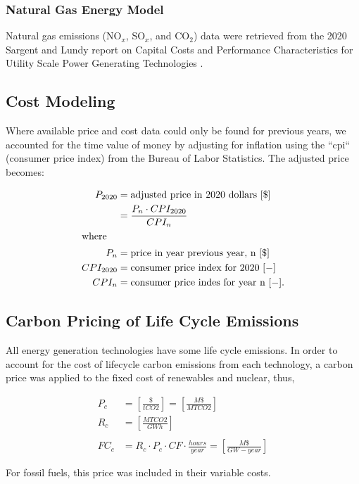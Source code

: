 \subsubsection{Natural Gas Energy Model}
Natural gas emissions (NO$_x$, SO$_x$, and CO$_2$) data were retrieved from the 
2020 Sargent and Lundy report on Capital Costs and Performance Characteristics 
for Utility Scale Power Generating Technologies 
\cite{sargent__lundy_capital_2020}.
\subsection{Cost Modeling}
Where available price and cost data could only be found for previous years, we 
                accounted for the time value of money by adjusting for 
                inflation using the ``cpi`` (consumer price index) from the 
                Bureau of Labor Statistics. The adjusted price becomes: 

\begin{align}
        P_{2020} &= \mbox{adjusted price in 2020 dollars }[\$]\\
                &= \frac{P_{n} \cdot CPI_{2020}}{CPI_{n}}\\
        \intertext{where}
        P_n &= \mbox{price in year previous year, n } [\$]\\
        CPI_{2020} &= \mbox{consumer price index for 2020 } [-]\\
        CPI_n &= \mbox{consumer price indes for year n } [-].
\end{align}


\subsection{Carbon Pricing of Life Cycle Emissions}
All energy generation technologies have some life cycle emissions.
In order to account for the cost of lifecycle carbon emissions from each 
technology, a carbon price was applied to the fixed cost of renewables and 
nuclear, thus,

\begin{align}
P_c &= \left[\frac{\$}{tCO2}\right] = \left[\frac{M\$}{MTCO2}\right]\\
R_c &= \left[\frac{MTCO2}{GWh}\right]\\\\
FC_c &= R_c\cdot P_c \cdot CF \cdot \frac{hours}{year} = \left[\frac{M\$}{GW-year}\right]
\end{align}

For fossil fuels, this price was included in their variable costs.

